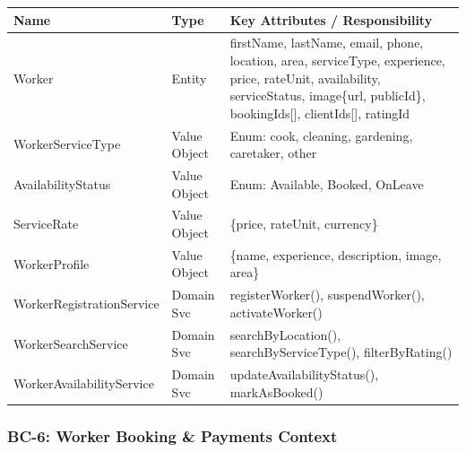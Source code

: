 \documentclass[12pt,a4paper]{article}
\begin{document}
\begin{center}
\begin{tabular}{@{}p{3.5cm}p{2cm}p{8.5cm}@{}}
\toprule
\textbf{Name} & \textbf{Type} & \textbf{Key Attributes / Responsibility} \\
\midrule
Worker & Entity & firstName, lastName, email, phone, location, area, serviceType, experience, price, rateUnit, availability, serviceStatus, image\{url, publicId\}, bookingIds[], clientIds[], ratingId \\
WorkerServiceType & Value Object & Enum: cook, cleaning, gardening, caretaker, other \\
AvailabilityStatus & Value Object & Enum: Available, Booked, OnLeave \\
ServiceRate & Value Object & \{price, rateUnit, currency\} \\
WorkerProfile & Value Object & \{name, experience, description, image, area\} \\
WorkerRegistrationService & Domain Svc & registerWorker(), suspendWorker(), activateWorker() \\
WorkerSearchService & Domain Svc & searchByLocation(), searchByServiceType(), filterByRating() \\
WorkerAvailabilityService & Domain Svc & updateAvailabilityStatus(), markAsBooked() \\
\bottomrule
\end{tabular}
\end{center}

\subsubsection{BC-6: Worker Booking \& Payments Context}
\end{document}
